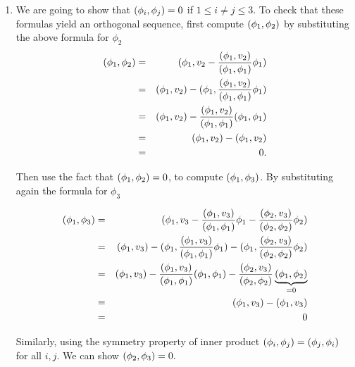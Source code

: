 \begin{solution}
\begin{enumerate}

\item We are going to show that $(\phi_i, \phi_j)=0$ if $1 \leq i \neq j\leq 3$. To check that these formulas yield an orthogonal sequence, first compute $(\phi_1, \phi_2)$ by substituting the above formula for $\phi_2$
\begin{eqnarray*}
( {\phi}_1, {\phi}_2) &=& ({ \phi}_1,  {v}_2-\frac{({ \phi}_1, { v}_2)}{({ \phi}_1, { \phi}_1)} { \phi}_1) \\
                         &=& ({ \phi}_1, { v}_2)-({\phi}_1 ,\frac{({\phi}_1, { v}_2)}{({ \phi}_1, { \phi}_1)} { \phi}_1) \\ 
                         &=&({ \phi}_1, { v}_2)- \frac{({ \phi}_1, { v}_2)}{({ \phi}_1, { \phi}_1)}({\phi}_1 ,{ \phi}_1) \\ 
                         &=&({ \phi}_1, { v}_2)-({ \phi}_1, { v}_2)\\
                         &=& 0.                                
\end{eqnarray*}

Then use the fact that $( {\phi}_1, {\phi}_2)=0 $, to compute $(\phi_1, \phi_3)$. By substituting again the formula for $\phi_3$

\begin{eqnarray*}
( {\phi}_1, {\phi}_3) &=& ({ \phi}_1,  { v}_3-\frac{({ \phi}_1, { v}_3)}{({ \phi}_1, { \phi}_1)} { \phi}_1 - \frac{({ \phi}_2, { v}_3)}{({ \phi}_2, { \phi}_2)} { \phi}_2)\\
                         &=&({ \phi}_1, { v}_3)-({\phi}_1 ,\frac{({\phi}_1, { v}_3)}{({ \phi}_1, { \phi}_1)} { \phi}_1) - ({\phi}_1 ,\frac{({\phi}_2, { v}_3)}{({ \phi}_2, { \phi}_2)} { \phi}_2) \\ 
                         &=&({ \phi}_1, { v}_3)- \frac{({ \phi}_1, { v}_3)}{({ \phi}_1, { \phi}_1)}({\phi}_1 ,{ \phi}_1) - \frac{({\phi}_2, { v}_3)}{({ \phi}_2, { \phi}_2)} \underbrace{({\phi}_1 , { \phi}_2)}_{=0}\\ 
                         &=&({ \phi}_1, { v}_3)-({ \phi}_1, { v}_3)\\
                         &=& 0                                 
\end{eqnarray*}


Similarly, using the symmetry property of inner product $ ( {\phi}_i, {\phi}_j)= ( {\phi}_j, {\phi}_i)$ for all $i,j$. We can show $( {\phi}_2, {\phi}_3)=0.$
 

\end{enumerate}
\end{solution}
